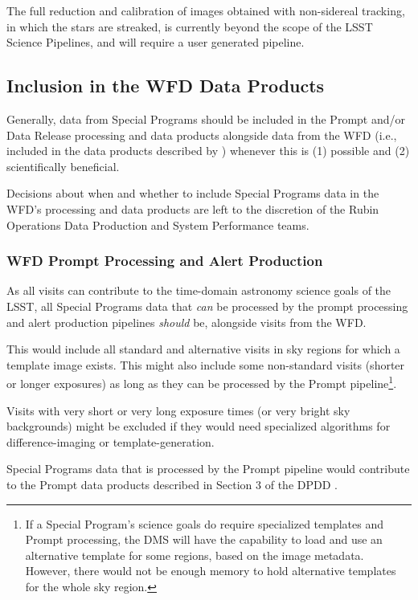 The full reduction and calibration of images obtained with non-sidereal 
tracking, in which the stars are streaked, is currently beyond the scope 
of the LSST Science Pipelines, and will require a user generated pipeline.


\subsection{Inclusion in the WFD Data Products}\label{ssec:proc_wfd}

Generally, data from Special Programs should be included in the Prompt 
and/or Data Release processing and data products alongside data from the 
WFD (i.e., included in the data products described by ) 
whenever this is (1) possible and (2) scientifically beneficial.

Decisions about when and whether to include Special Programs data in 
the WFD's processing and data products are left to the discretion of the 
Rubin Operations Data Production and System Performance teams.


\subsubsection{WFD Prompt Processing and Alert Production}

As all visits can contribute to the time-domain astronomy science goals 
of the LSST, all Special Programs data that {\it can} be processed by the 
prompt processing and alert production pipelines {\it should} be, 
alongside visits from the WFD.

This would include all standard and alternative visits in sky regions for which 
a template image exists.
This might also include some non-standard visits (shorter or longer exposures) 
as long as they can be processed by the Prompt 
pipeline\footnote{If a Special Program's science goals do require 
specialized templates and 
Prompt processing, the DMS will have the capability to load and use an 
alternative template for some regions, based on the image metadata. 
However, there would not be enough memory to hold alternative templates 
for the whole sky region.}.

Visits with very short or very long exposure times (or very bright sky 
backgrounds) might be excluded if they would 
need specialized algorithms for difference-imaging or template-generation.

Special Programs data that is processed by the Prompt pipeline would 
contribute to the Prompt data products described in Section 3 of the 
DPDD . 

